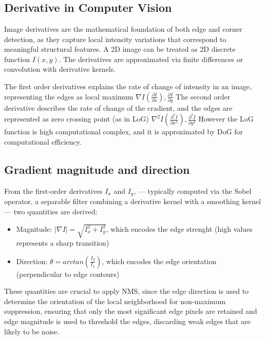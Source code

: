 
\section[Question -- {\it Derivatives}]{}

\subsection{Derivative in Computer Vision}
Image derivatives are the mathematical foundation of both edge and corner detection, as they capture local intensity variations that correspond to meaningful structural features.
A 2D image can be treated as 2D discrete function $I(x,y)$. The derivatives are approximated via finite
differences or convolution with derivative kernels.

The first order derivatives explains the rate of change of intensity in an image, representing the edges as local maximum $\nabla I (\frac{\partial I}{\partial x}),\frac{\partial I}{\partial y}$
The second order derivative describes the rate of change of the cradient, and the edges are represented as zero crossing point (as in LoG) $\nabla^2 I (\frac{\partial^2 I}{\partial x^2}),\frac{\partial^2 I}{\partial y^2}$
However the LoG function is high computational complex, and it is approximated by DoG for computational efficiency.

\subsection{Gradient magnitude and direction}
From the first-order derivatives $I_x$ and $I_y$, — typically computed via the Sobel operator, a separable filter combining a derivative kernel with a smoothing kernel — 
two quantities are derived:
\begin{itemize}
\item Magnitude: $|\nabla I| = \sqrt{I_x ^2 + I_y ^2}$, which encodes the edge strenght (high values represents a sharp transition)
\item Direction: $\theta = arctan(\frac{I_y}{I_x})$, which encodes the edge orientation (perpendicular to edge contours)
\end{itemize}
These quantities are crucial to apply NMS, since the edge direction is used to determine the orientation of the local neighborhood for non-maximum suppression, ensuring that only the most significant edge pixels are retained 
and edge magnitude is used to threshold the edges, discarding weak edges that are likely to be noise.

